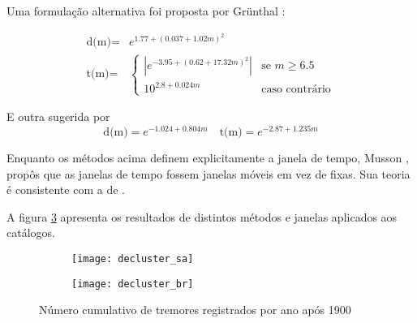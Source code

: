 Uma formulação alternativa foi proposta por Gr\"unthal \citep{marsan_david_2012} :

\begin{equation}\begin{split} 
\mbox{d(m)} = & e^{1.77 + \left( {0.037 + 1.02 m} \right)^2} \\ 
   \mbox{t(m)} = & \begin{cases}   |e^{-3.95+ \left( {0.62 + 17.32 m}
    \right)^2}|    & \text{se $m \geq 6.5$ } \\ 10^{2.8 + 0.024 m} & 
    \text{caso contrário}  \end{cases}\end{split}
\end{equation}

E outra sugerida por \citet{uhrhammer_1986}
%
\begin{equation}
\mbox{d(m)} = e^{-1.024 + 0.804 m} \quad \mbox{t(m)} = 
    e^{-2.87 + 1.235 m}
\end{equation}

Enquanto os métodos acima definem explicitamente a janela de tempo, Musson \citet{musson_1999}, propôs que as janelas de tempo
fossem janelas móveis em vez de fixas. Sua teoria é consistente com a de \citet{gardner_1974}.

A figura \ref{fig:eq_decluster_cum} apresenta os resultados de distintos métodos e janelas aplicados aos 
catálogos.

\begin{figure}[H]
	\centering
	\begin{subfigure}[b]{0.48\textwidth}
		  	\centering
			\texttt{[image: decluster\_sa]}
			\label{fig:sa_eq_record}
	\end{subfigure}%
	\quad %
	\begin{subfigure}[b]{0.48\textwidth}
		  	\centering
			\texttt{[image: decluster\_br]}
			\label{fig:br_eq_record}
    \end{subfigure}%
	\caption{Número cumulativo de tremores registrados por ano após 1900}
	\label{fig:eq_decluster_cum}
\end{figure}

